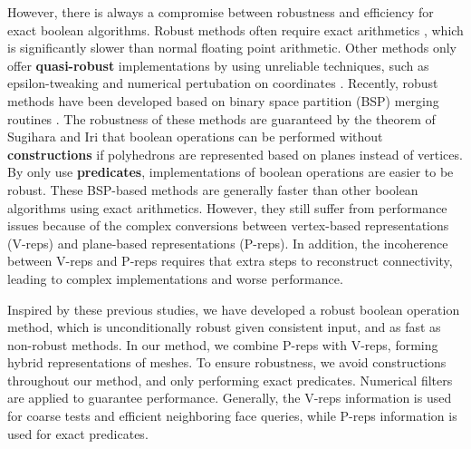 However, there is always a compromise between robustness and efficiency for exact boolean algorithms.
Robust methods often require exact arithmetics \cite{barki2015exact,zhou2016mesh}, which is significantly slower than normal floating point arithmetic.
Other methods only offer \textbf{quasi-robust} \cite{shewchuk1999lecture} implementations by using unreliable techniques, such as epsilon-tweaking \cite{laidlaw1986constructive,feito2013fast,segal1990using} and numerical pertubation on coordinates \cite{douze2015quickcsg}.
Recently, robust methods have been developed \cite{bernstein2009fast,campen2010exact} based on binary space partition (BSP) merging routines \cite{naylor1990merging,thibault1987set}.
The robustness of these methods are guaranteed by the theorem of Sugihara and Iri \cite{sugihara1990solid} that boolean operations can be performed without \textbf{constructions} \cite{shewchuk1999lecture} if polyhedrons are represented based on planes instead of vertices.
By only use \textbf{predicates}, implementations of boolean operations are easier to be robust.
These BSP-based methods are generally faster than other boolean algorithms using exact arithmetics. However, they still suffer from performance issues because of the complex conversions between vertex-based representations (V-reps) and plane-based representations (P-reps). In addition, the incoherence between V-reps and P-reps requires that extra steps to reconstruct connectivity, leading to complex implementations and worse performance.


Inspired by these previous studies, we have developed a robust boolean operation method, which is unconditionally robust given consistent input, and as fast as non-robust methods. In our method, we combine P-reps with V-reps, forming hybrid representations of meshes. To ensure robustness, we avoid constructions throughout our method, and only performing exact predicates. Numerical filters \cite{shewchuk1997adaptive} are applied to guarantee performance. Generally, the V-reps information is used for coarse tests and efficient neighboring face queries, while P-reps information is used for exact predicates.


